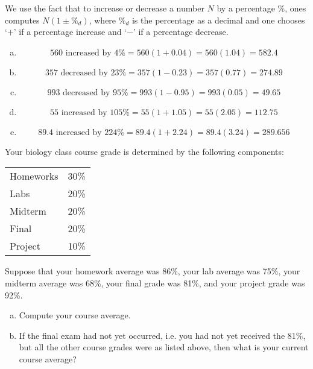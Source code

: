 \documentclass[11pt,letterpaper]{article}
\begin{document}
\sol We use the fact that to increase or decrease a number $N$ by a percentage \%, ones computes $N(1 \pm \%_d)$, where $\%_d$ is the percentage as a decimal and one chooses `$+$' if a percentage increase and `$-$' if a percentage decrease. 
\begin{enumerate}[(a)]
\item 
	\[
	\text{560 increased by 4\%}= 560 (1 + 0.04)= 560(1.04)= 582.4
	\] \pspace

\item 
	\[
	\text{357 decreased by 23\%}= 357 (1 - 0.23)= 357(0.77)= 274.89
	\] \pspace

\item 
	\[
	\text{993 decreased by 95\%}= 993(1 - 0.95)= 993(0.05)= 49.65
	\] \pspace

\item 
	\[
	\text{55 increased by 105\%}= 55(1 + 1.05)= 55(2.05)= 112.75
	\] \pspace

\item 
	\[
	\text{89.4 increased by 224\%}= 89.4(1 + 2.24)= 89.4(3.24)= 289.656
	\] 
\end{enumerate}



\newpage



 Your biology class course grade is determined by the following components: \par
	\begin{table}[h]
	\centering
	\begin{tabular}{lr}
	Homeworks & 30\% \\
	Labs & 20\% \\
	Midterm & 20\% \\
	Final & 20\% \\
	Project & 10\% \\
	\end{tabular}
	\end{table} \par
Suppose that your homework average was 86\%, your lab average was 75\%, your midterm average was 68\%, your final grade was 81\%, and your project grade was 92\%. 
	\begin{enumerate}[(a)]
	\item Compute your course average.
	\item If the final exam had not yet occurred, i.e. you had not yet received the 81\%, but all the other course grades were as listed above, then what is your current course average?
	\end{enumerate} 
\end{document}
